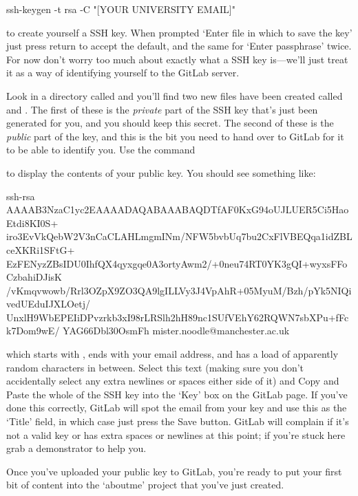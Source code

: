 \begin{ttoutenv}
ssh-keygen -t rsa -C "[YOUR UNIVERSITY EMAIL]"
\end{ttoutenv}

to create yourself a SSH key. When prompted `Enter file in which to save the key' just press return to accept the default, and the same for `Enter passphrase' twice.  For now don't worry too much about exactly what a SSH key is---we'll just treat it as a way of identifying yourself to the GitLab server. 

Look in a directory called  and you'll find two new files have been created called  and . The first of these is the \textit{private} part of the SSH key that's just been generated for you, and you should keep this secret. The second of these is the \textit{public} part of the key, and this is the bit you need to hand over to GitLab for it to be able to identify you. Use the command

to display the contents of your public key. You should see something like:

\begin{ttoutenv}
  
  ssh-rsa  AAAAB3NzaC1yc2EAAAADAQABAAABAQDTfAF0KxG94oUJLUER5Ci5HaoEtdi8KI0S+
  iro3EvVkQebW2V3nCaCLAHLmgmINm/NFW5bvbUq7bu2CxFlVBEQqa1idZBLceXKRi1SFtG+
  EzFENyzZBsIDU0IhfQX4qyxgqe0A3ortyAwm2/+0neu74RT0YK3gQI+wyxsFFoCzbahiDJisK
  /vKmqvwowb/Rrl3OZpX9ZO3QA9lgILLVy3J4VpAhR+05MyuM/Bzh/pYk5NIQivedUEduIJXLOetj/
  UnxlH9WbEPEIiDPvzrkb3xI98rLRSlh2hH89nc1SUfVEhY62RQWN7sbXPu+fFck7Dom9wE/
  YAG66Dbl30OsmFh mister.noodle@manchester.ac.uk

\end{ttoutenv}

which starts with , ends with your email address, and has a load of apparently random characters in between. Select this text (making sure you don't accidentally select any extra newlines or spaces either side of it) and 
Copy and Paste the whole of the SSH key into the `Key' box on the GitLab page. If you've done this correctly, GitLab will spot the email from your key and use this as the `Title' field, in which case just press the Save button. GitLab will complain if it's not a valid key or has extra spaces or newlines at this point; if you're stuck here grab a demonstrator to help you. 

Once you've uploaded your public key to GitLab, you're ready to put your first bit of content into the `aboutme' project that you've just created. 

